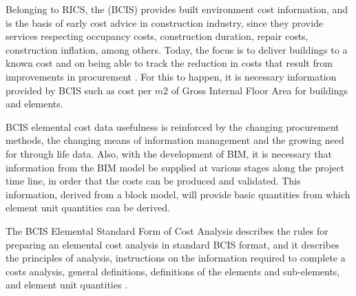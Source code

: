 Belonging to RICS, the   (BCIS) provides built environment cost information, and is the basis of early cost advice in construction industry, since they provide services respecting occupancy costs, construction duration, repair costs, construction inflation, among others. 
Today, the focus is to deliver buildings to a known cost and on being able to track the reduction in costs that result from improvements in procurement \cite{BCIS2008}. For this to happen, it is necessary information provided by BCIS such as cost per $m2$ of Gross Internal Floor Area for buildings and elements.

BCIS elemental cost data usefulness is reinforced by the changing procurement methods, the changing means of information management and the growing need for through life data. Also, with the development of BIM, it is necessary that information from the BIM model be supplied at various stages along the project time line, in order that the costs can be produced and validated. This information, derived from a block model, will provide basic quantities from which element unit quantities can be derived.

The BCIS Elemental Standard Form of Cost Analysis \cite{BCIS2008} describes the rules for preparing an elemental cost analysis in standard BCIS format, and it describes the principles of analysis, instructions on the information required to complete a costs analysis, general definitions, definitions of the elements and sub-elements, and element unit quantities \cite{BCIS2008}.


